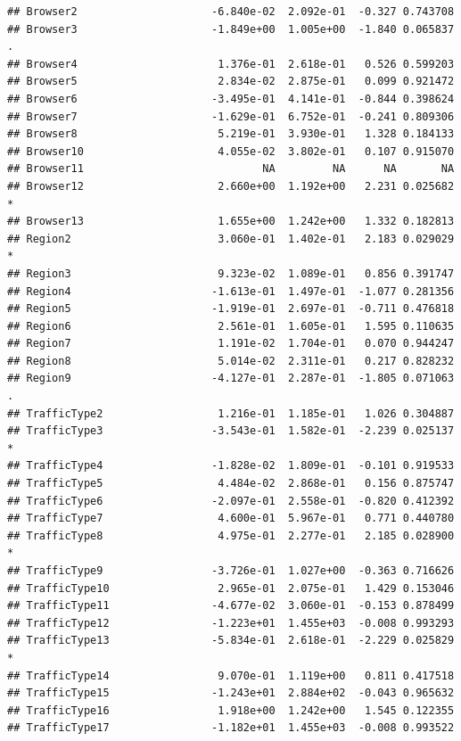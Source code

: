 \documentclass[
]{article}
\begin{document}
\begin{verbatim}
## Browser2                     -6.840e-02  2.092e-01  -0.327 0.743708    
## Browser3                     -1.849e+00  1.005e+00  -1.840 0.065837 .  
## Browser4                      1.376e-01  2.618e-01   0.526 0.599203    
## Browser5                      2.834e-02  2.875e-01   0.099 0.921472    
## Browser6                     -3.495e-01  4.141e-01  -0.844 0.398624    
## Browser7                     -1.629e-01  6.752e-01  -0.241 0.809306    
## Browser8                      5.219e-01  3.930e-01   1.328 0.184133    
## Browser10                     4.055e-02  3.802e-01   0.107 0.915070    
## Browser11                            NA         NA      NA       NA    
## Browser12                     2.660e+00  1.192e+00   2.231 0.025682 *  
## Browser13                     1.655e+00  1.242e+00   1.332 0.182813    
## Region2                       3.060e-01  1.402e-01   2.183 0.029029 *  
## Region3                       9.323e-02  1.089e-01   0.856 0.391747    
## Region4                      -1.613e-01  1.497e-01  -1.077 0.281356    
## Region5                      -1.919e-01  2.697e-01  -0.711 0.476818    
## Region6                       2.561e-01  1.605e-01   1.595 0.110635    
## Region7                       1.191e-02  1.704e-01   0.070 0.944247    
## Region8                       5.014e-02  2.311e-01   0.217 0.828232    
## Region9                      -4.127e-01  2.287e-01  -1.805 0.071063 .  
## TrafficType2                  1.216e-01  1.185e-01   1.026 0.304887    
## TrafficType3                 -3.543e-01  1.582e-01  -2.239 0.025137 *  
## TrafficType4                 -1.828e-02  1.809e-01  -0.101 0.919533    
## TrafficType5                  4.484e-02  2.868e-01   0.156 0.875747    
## TrafficType6                 -2.097e-01  2.558e-01  -0.820 0.412392    
## TrafficType7                  4.600e-01  5.967e-01   0.771 0.440780    
## TrafficType8                  4.975e-01  2.277e-01   2.185 0.028900 *  
## TrafficType9                 -3.726e-01  1.027e+00  -0.363 0.716626    
## TrafficType10                 2.965e-01  2.075e-01   1.429 0.153046    
## TrafficType11                -4.677e-02  3.060e-01  -0.153 0.878499    
## TrafficType12                -1.223e+01  1.455e+03  -0.008 0.993293    
## TrafficType13                -5.834e-01  2.618e-01  -2.229 0.025829 *  
## TrafficType14                 9.070e-01  1.119e+00   0.811 0.417518    
## TrafficType15                -1.243e+01  2.884e+02  -0.043 0.965632    
## TrafficType16                 1.918e+00  1.242e+00   1.545 0.122355    
## TrafficType17                -1.182e+01  1.455e+03  -0.008 0.993522    

\end{verbatim}
\end{document}

